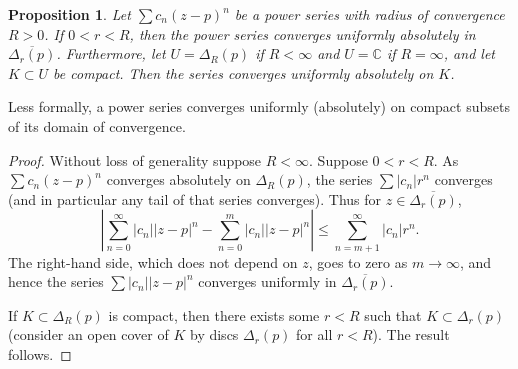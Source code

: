\documentclass[12pt,openany]{book}
\newcommand{\sabs}[1]{\lvert {#1} \rvert}
\newcommand{\abs}[1]{\left\lvert {#1} \right\rvert}
\newcommand{\C}{{\mathbb{C}}}
\theoremstyle{plain}
\newtheorem{prop}[thm]{Proposition}
\theoremstyle{remark}
\theoremstyle{definition}
\theoremstyle{exercise}
\theoremstyle{example}
\begin{document}
\begin{prop}
Let $\sum c_n {(z-p)}^n$ be a power series with radius of convergence $R
> 0$.  If $0 < r < R$, then the power series converges uniformly absolutely
in $\overline{\Delta_r(p)}$. Furthermore, let $U = \Delta_R(p)$ if $R < \infty$ and
$U = \C$ if $R=\infty$, and let $K \subset U$ be compact.
Then the series converges uniformly absolutely on $K$.
\end{prop}

Less formally, a power series converges uniformly (absolutely) on
compact subsets of its domain of convergence.

\begin{proof}
Without loss of generality suppose $R < \infty$.
Suppose $0 < r < R$.  As $\sum c_n {(z-p)}^n$ converges absolutely
on $\Delta_R(p)$, the series
$\sum \sabs{c_n} r^n$ converges (and in particular any tail of
that series converges).  Thus for $z \in \overline{\Delta_r(p)}$,
\begin{equation*}
\abs{
\sum_{n=0}^\infty \sabs{c_n} \sabs{z-p}^n
-
\sum_{n=0}^{m} \sabs{c_n} \sabs{z-p}^n
}
\leq
\sum_{n=m+1}^\infty \sabs{c_n} r^n .
\end{equation*}
The right-hand side, which does not depend on $z$,
goes to zero as $m \to \infty$, and hence 
the series $\sum \sabs{c_n} \sabs{z-p}^n$ converges uniformly in $\overline{\Delta_r(p)}$.

If $K \subset \Delta_{R}(p)$ is compact, then there exists some $r <
R$ such that $K \subset \Delta_r(p)$ (consider an open cover of
$K$ by discs $\Delta_r(p)$ for all $r < R$).  The result follows.
\end{proof}
\end{document}
